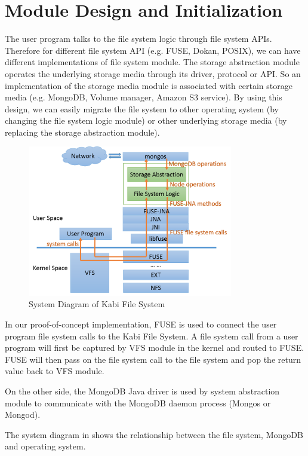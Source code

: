 \section{Module Design and Initialization}

    The user program talks to the file system logic through file system APIs. Therefore for different file system API (e.g. FUSE, Dokan, POSIX), we can have different implementations of file system module. The storage abstraction module operates the underlying storage media through its driver, protocol or API. So an implementation of the storage media module is associated with certain storage media (e.g. MongoDB, Volume manager, Amazon S3 service). By using this design, we can easily migrate the file system to other operating system (by changing the file system logic module) or other underlying storage media (by replacing the storage abstraction module).

\begin{figure}[hbtp]
\centering
\includegraphics[width=0.8\textwidth]{Chapter-3/figs/fig1.png}
\caption{System Diagram of Kabi File System}
\label{fig:diagram}
\end{figure}

	In our proof-of-concept implementation, FUSE is used to connect the user program file system calls to the Kabi File System. A file system call from a user program will first be captured by VFS module in the kernel and routed to FUSE. FUSE will then pass on the file system call to the file system and pop the return value back to VFS module.

    On the other side, the MongoDB Java driver is used by system abstraction module to communicate with the MongoDB daemon process (Mongos or Mongod).
    
    The system diagram in  shows the relationship between the file system, MongoDB and operating system.

